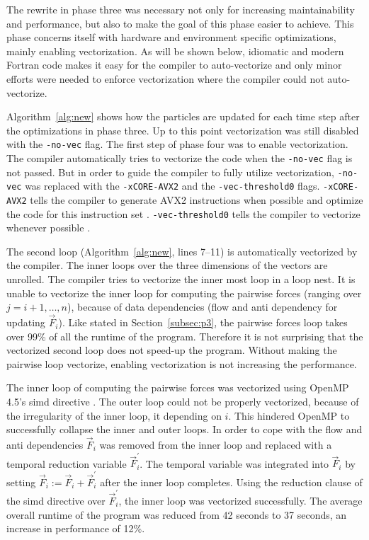 \documentclass[twoside,11pt]{article}
\begin{document}
The rewrite in phase three was necessary not only for increasing
maintainability and performance, but also to make the goal of this
phase easier to achieve.
This phase concerns itself with hardware and environment specific
optimizations, mainly enabling vectorization.
As will be shown below, idiomatic and modern Fortran code makes it
easy for the compiler to auto-vectorize and only minor efforts were
needed to enforce vectorization where the compiler could not
auto-vectorize.

Algorithm~\ref{alg:new} shows how the particles are updated for each
time step after the optimizations in phase three.
Up to this point vectorization was still disabled with the
\texttt{-no-vec} flag.
The first step of phase four was to enable vectorization.
The compiler automatically tries to vectorize the code when the
\texttt{-no-vec} flag is not passed.
But in order to guide the compiler to fully utilize vectorization,
\texttt{-no-vec} was replaced with the \texttt{-xCORE-AVX2} and the
\texttt{-vec-threshold0} flags.
\texttt{-xCORE-AVX2} tells the compiler to generate AVX2 instructions
when possible and optimize the code for this instruction set
\citep{xcore_avx2}.
\texttt{-vec-threshold0} tells the compiler to vectorize whenever
possible \citep{vec_threshold0}.

The second loop (Algorithm~\ref{alg:new}, lines 7--11)
is automatically vectorized by the compiler.
The inner loops over the three dimensions of the vectors are unrolled.
The compiler tries to vectorize the inner most loop in a loop nest.
It is unable to vectorize the inner loop for computing the pairwise
forces (ranging over $j=i+1,\dots,n$), because of data dependencies
(flow and anti dependency for updating $\vec{F}_i$).
Like stated in Section~\ref{subsec:p3}, the pairwise forces loop takes
over 99\% of all the runtime of the program.
Therefore it is not surprising that the vectorized second loop does
not speed-up the program.
Without making the pairwise loop vectorize, enabling vectorization is
not increasing the performance.

The inner loop of computing the pairwise forces was vectorized using
OpenMP 4.5's simd directive \citep{omp}.
The outer loop could not be properly vectorized, because of the
irregularity of the inner loop, it depending on $i$.
This hindered OpenMP to successfully collapse the inner and outer
loops.
In order to cope with the flow and anti dependencies $\vec{F}_i$ was
removed from the inner loop and replaced with a temporal reduction
variable $\vec{F}^\prime_i$.
The temporal variable was integrated into $\vec{F}_i$ by setting
$\vec{F}_i := \vec{F}_i + \vec{F}^\prime_i$ after the inner loop
completes.
Using the reduction clause of the simd directive over
$\vec{F}^\prime_i$, the inner loop was vectorized successfully.
The average overall runtime of the program was reduced from 42 seconds
to 37 seconds, an increase in performance of 12\%.
\end{document}

